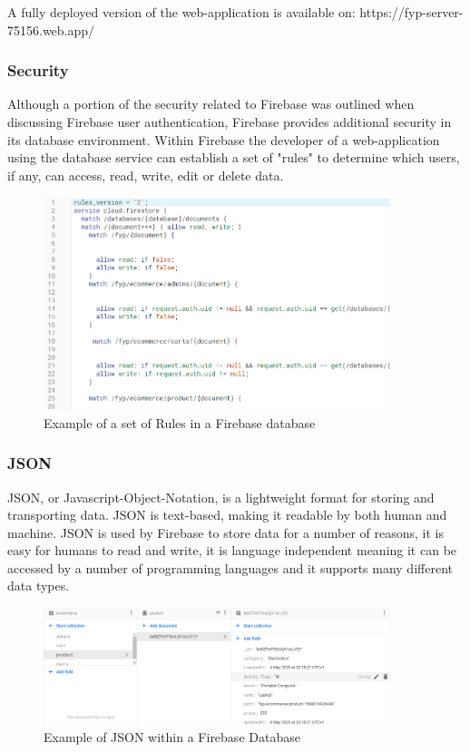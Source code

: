A fully deployed version of the web-application is available on: https://fyp-server-75156.web.app/ \\

\subsubsection{Security}
Although a portion of the security related to Firebase was outlined when discussing Firebase user authentication, Firebase provides additional security in its database environment. Within Firebase the developer of a web-application using the database service can establish a set of "rules" to determine which users, if any, can access, read, write, edit or delete data. 
\begin{figure}[h!]
    	\caption{Example of a set of Rules in a Firebase database}
	\centering
	\includegraphics[width=0.9\textwidth]{images/fbrules.png}
\end{figure}

\newpage

\subsubsection{JSON}
JSON, or Javascript-Object-Notation, is a lightweight format for storing and transporting data. JSON is text-based, making it readable by both human and machine. JSON is used by Firebase to store data for a number of reasons, it is easy for humans to read and write, it is language independent meaning it can be accessed by a number of programming languages and it supports many different data types\cite{inproceedings}. 

\begin{figure}[h!]
    	\caption{Example of JSON within a Firebase Database}
	\centering
	\includegraphics[width=0.9\textwidth]{images/jsonfb.png}
\end{figure} 

